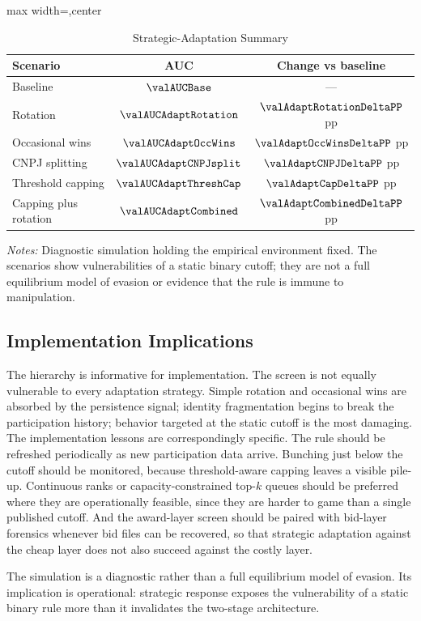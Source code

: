 \begin{table}[htbp]
\centering
\caption{Strategic-Adaptation Summary}
\label{tab:adaptation_summary_submission}
\footnotesize
\begin{adjustbox}{max width=\textwidth,center}
\begin{threeparttable}
\begin{tabular}{p{4.4cm}cc}
\toprule
Scenario & AUC & Change vs baseline \\
\midrule
Baseline & $\valAUCBase$ & --- \\
Rotation & $\valAUCAdaptRotation$ & $\valAdaptRotationDeltaPP$ pp \\
Occasional wins & $\valAUCAdaptOccWins$ & $\valAdaptOccWinsDeltaPP$ pp \\
CNPJ splitting & $\valAUCAdaptCNPJsplit$ & $\valAdaptCNPJDeltaPP$ pp \\
Threshold capping & $\valAUCAdaptThreshCap$ & $\valAdaptCapDeltaPP$ pp \\
Capping plus rotation & $\valAUCAdaptCombined$ & $\valAdaptCombinedDeltaPP$ pp \\
\bottomrule
\end{tabular}
\begin{tablenotes}
\footnotesize
\item \textit{Notes:} Diagnostic simulation holding the empirical
environment fixed. The scenarios show vulnerabilities of a static
binary cutoff; they are not a full equilibrium model of evasion
or evidence that the rule is immune to manipulation.
\end{tablenotes}
\end{threeparttable}
\end{adjustbox}
\end{table}

\subsection{Implementation Implications}
\label{app:adaptation_implementation_submission}

The hierarchy is informative for implementation. The screen is
not equally vulnerable to every adaptation strategy. Simple
rotation and occasional wins are absorbed by the persistence
signal; identity fragmentation begins to break the participation
history; behavior targeted at the static cutoff is the most
damaging. The implementation lessons are correspondingly
specific. The rule should be refreshed periodically as new
participation data arrive. Bunching just below the cutoff should
be monitored, because threshold-aware capping leaves a
visible pile-up. Continuous ranks or capacity-constrained
top-$k$ queues should be preferred where they are operationally
feasible, since they are harder to game than a single published
cutoff. And the award-layer screen should be paired with
bid-layer forensics whenever bid files can be recovered, so
that strategic adaptation against the cheap layer does not also
succeed against the costly layer.

The simulation is a diagnostic rather than a full equilibrium
model of evasion. Its implication is operational: strategic
response exposes the vulnerability of a static binary rule more
than it invalidates the two-stage architecture.
